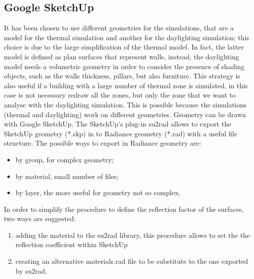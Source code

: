 \subsection{Google SketchUp}
It has been chosen to use different geometries for the simulations, that are a model for the thermal simulation and another for the daylighting simulation; this choice is due to the large simplification of the thermal model. In fact, the latter model is defined as plan surfaces that represent walls, instead, the daylighting model needs a volumetric geometry in order to consider the presence of shading objects, such as the walls thickness, pillars, but also furniture. This strategy is also useful if a building with a large number of thermal zone is simulated, in this case is not necessary redraw all the zones, but only the zone that we want to analyse with the daylighting simulation. This is possible because the simulations (thermal and daylighting) work on different geometries.  
Geometry can be drawn with Google SketchUp. The SketchUp's plug-in su2rad allows to export the SketchUp geometry (*.skp) in to Radiance geometry (*.rad) with a useful file structure. The possible ways to export in Radiance geometry are:

\begin{itemize}
\renewcommand{\labelitemi}{\tiny$\blacksquare$}
\item by group, for complex geometry;
\item by material, small number of files;
\item by layer, the more useful for geometry not so complex.
\end{itemize}

In order to simplify the procedure to define the reflection factor of the surfaces, two ways are suggested:
\begin{enumerate}
\item adding the material to the su2rad library, this procedure allows to set the the reflection coefficient within SketchUp
\item creating an alternative materials.rad file to be substitute to the one exported by su2rad.
\end{enumerate}

